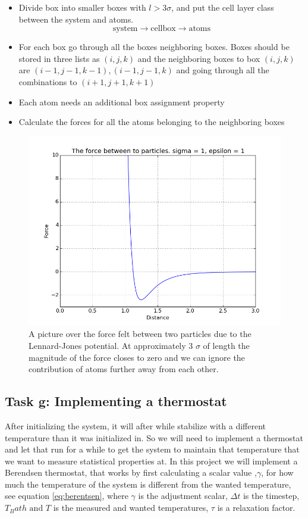 \documentclass[11pt]{article}
\begin{document}
	\begin{itemize}
		\item Divide box into smaller boxes with \(l >3\sigma\), and put the cell layer class between the system and atoms.
				\[\text{system} \rightarrow\text{cellbox} \rightarrow \text{atoms}\]
		\item For each box go through all the boxes neighboring boxes. Boxes should be stored in three lists as \((i,j,k)\) and the neighboring boxes to box \((i,j,k)\) are \( (i-1, j-1, k-1), (i-1,j-1,k) \) and going through all the combinations to \( (i+1,j+1,k+1) \)
		\item Each atom needs an additional box assignment property
		\item Calculate the forces for all the atoms belonging to the neighboring boxes
	\end{itemize}

	
	\begin{figure}
		\includegraphics[scale = 0.5]{forcePlot}
		\caption{A picture over the force felt between two particles due to the Lennard-Jones potential. At approximately 3 \(\sigma\) of length the magnitude of the force closes to zero and we can ignore the contribution of atoms further away from each other.}
		\label{fig:force}
	\end{figure}

\subsection{Task g: Implementing a thermostat}
	After initializing the system, it will after while stabilize with a different temperature than it was initialized in. So we will need to implement a thermostat and let that run for a while to get the system to maintain that temperature that we want to measure statistical properties at. In this project we will implement a Berendsen thermostat, that works by first calculating a scalar value ,\(\gamma\), for how much the temperature of the system is different from the wanted temperature, see equation \eqref{eq:berentsen}, where \(\gamma\) is the adjustment scalar, \( \Delta t \) is the timestep, \( T_Bath \text{ and } T\) is the measured and wanted temperatures, \(\tau\) is a relaxation factor. 
\end{document}
